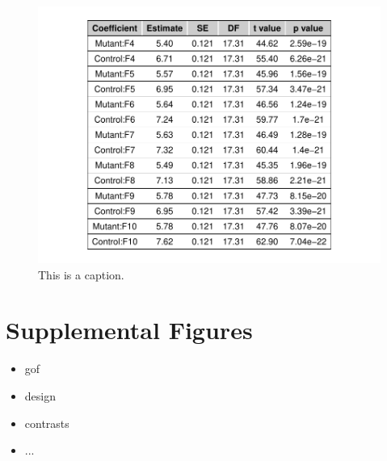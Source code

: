 \documentclass[11pt]{elife}\usepackage[]{graphicx}\usepackage[]{color}
\makeatletter
\def\maxwidth{ %
  \ifdim\Gin@nat@width>\linewidth
    \linewidth
  \else
    \Gin@nat@width
  \fi
}
\newenvironment{knitrout}{}{} %
\makeatother
\begin{document}
\begin{figure}
\begin{knitrout}
\color{fgcolor}

{\centering \includegraphics[width=\maxwidth]{figure/tab0-1} 

}



\end{knitrout}
	\caption{This is a caption.}
	\label{fig:tab0}
\end{figure}

\newpage


\section{Supplemental Figures}

\begin{itemize}
	\item gof
	\item design
	\item contrasts
	\item ...
\end{itemize}

\newpage


\end{document}
